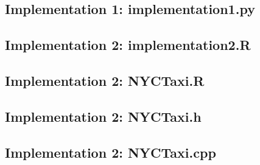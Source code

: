 \documentclass{article}
\begin{document}
\subsection*{Implementation 1: \textbf{implementation1.py}}

\subsection*{Implementation 2: \textbf{implementation2.R}}

\subsection*{Implementation 2: \textbf{NYCTaxi.R}}

\subsection*{Implementation 2: \textbf{NYCTaxi.h}}

\subsection*{Implementation 2: \textbf{NYCTaxi.cpp}}



\end{document}
